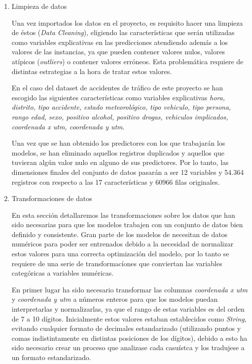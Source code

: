             \begin{enumerate}

                \item Limpieza de datos

                    Una vez importados los datos en el proyecto, es requisito hacer una limpieza de éstos (\textit{Data Cleaning}), eligiendo las características que serán utilizadas como variables explicativas en las predicciones atendiendo además a los valores de las instancias, ya que pueden contener valores nulos, valores atípicos (\textit{outliers}) o contener valores erróneos. Esta problemática requiere de distintas estrategias a la hora de tratar estos valores.

                    En el caso del dataset de accidentes de tráfico de este proyecto se han escogido las siguientes características como variables explicativas \textit{hora, distrito, tipo accidente, estado meteorológico, tipo vehiculo, tipo persona, rango edad, sexo, positivo alcohol, positivo drogas, vehiculos implicados, coordenada x utm, coordenada y utm}.


                    Una vez que se han obtenido los predictores con los que trabajarán los modelos, se han eliminado aquellos registros duplicados y aquellos que tuvieran algún valor nulo en alguno de sus predictores. Por lo tanto, las dimensiones finales del conjunto de datos pasarán a ser 12 variables y 54.364 registros con respecto a las 17 características y 60966 filas originales. 

                \item Transformaciones de datos

                    En esta sección detallaremos las transformaciones sobre los datos que han sido necesarias para que los modelos trabajen con un conjunto de datos bien definido y consistente. Gran parte de los modelos de  necesitan de datos numéricos para poder ser entrenados debido a la necesidad de normalizar estos valores para una correcta optimización del modelo, por lo tanto se requiere de una serie de transformacíones que conviertan las variables categóricas a variables numéricas.

                    En primer lugar ha sido necesario transformar las columnas \textit{coordenada x utm} y \textit{coordenada y utm} a números enteros para que los modelos puedan interpretarlas y normalizarlas, ya que el rango de estas variables es del orden de 7 a 10 dígitos. Inicialmente estos valores estaban establecidos como \textit{String}, evitando cualquier formato de decimales estandarizado (utilizando puntos y comas indistintamente en distintas posiciones de los dígitos), debido a esto ha sido necesario crear un proceso que analizase cada casuístca y los tradujese a un formato estandarizado.


\end{enumerate}
